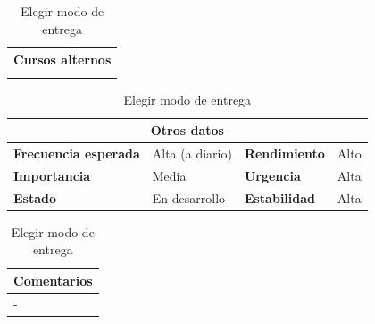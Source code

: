 \documentclass[12pt,spanish]{article}
\begin{document}
\begin{table}[H]
\vspace{1cm}

\begin{tabular}{|m{10pt}|m{7.15cm}|m{10pt}|m{7.15cm}|}
\hline
\multicolumn{4}{|m{16.2cm}|}{\textbf{Cursos alternos}} \\
\hline
\\
\hline
\end{tabular}

\vspace{1cm}

\begin{tabular}{|m{3.72cm}|m{3.72cm}|m{3.72cm}|m{3.72cm}|}
\hline
\multicolumn{4}{|c|}{\textbf{Otros datos}} \\
\hline
\textbf{Frecuencia esperada} & Alta (a diario) & \textbf{Rendimiento} & Alto \\
\hline
\textbf{Importancia} & Media & \textbf{Urgencia} & Alta \\
\hline
\textbf{Estado} & En desarrollo & \textbf{Estabilidad} & Alta \\
\hline
\end{tabular}

\vspace{1cm}

\begin{tabular}{|m{16.2cm}|}
\hline
\textbf{Comentarios} \\
\hline
- \\
\hline
\end{tabular}

\caption{Elegir modo de entrega}

\end{table}


\end{document}
